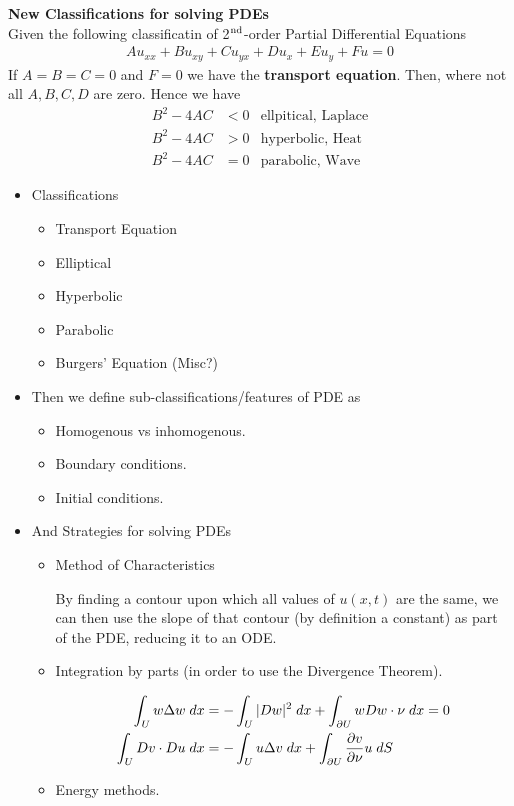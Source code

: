 \documentclass[12pt,a4paper]{report}
\begin{document}
{\newpage
\noindent\textbf{\Large{New Classifications for solving PDEs}}\\

Given the following classificatin of 2$\textsuperscript{nd}$-order Partial Differential Equations
\begin{align*}
	Au_{xx}+Bu_{xy}+Cu_{yx}+Du_{x}+Eu_y+Fu=0
	\end{align*}If $A=B=C=0$ and $F=0$ we have the \textbf{transport equation}.  Then, where not all $A,B,C,D$ are zero.  Hence we have
\begin{align*}
	B^2-4AC &<0 & \text{ellpitical, Laplace} \\
	B^2-4AC &>0 & \text{hyperbolic, Heat} \\
	B^2-4AC &=0 & \text{parabolic, Wave} 
\end{align*}

\begin{itemize}

\item Classifications
\begin{itemize}
	\item Transport Equation
	\item Elliptical
	\item Hyperbolic
	\item Parabolic
	\item Burgers' Equation (Misc?)
\end{itemize}

\item Then we define sub-classifications/features of PDE as
\begin{itemize}
	\item Homogenous vs inhomogenous.
	\item Boundary conditions.
	\item Initial conditions.
\end{itemize}

\item And Strategies for solving PDEs
\begin{itemize}
	\item Method of Characteristics
	
	By finding a contour upon which all values of $u(x,t)$ are the same, we can then use the slope of that contour (by definition a constant) as part of the PDE, reducing it to an ODE.
	
	\item Integration by parts (in order to use the Divergence Theorem).
	
	\begin{align*}
		\int_U w\Delta w\; dx &= -\int_U |Dw|^2\;  dx+\int_{\partial U}wDw\cdot \nu\;  dx = 0 \\
	\int_U Dv\cdot Du\;  dx &= -\int_U u\Delta v \; dx + \int_{\partial U} \frac{\partial v}{\partial \nu}u\;  dS
	\end{align*}
	\item Energy methods.
\end{itemize}


\end{itemize}}
\end{document}
